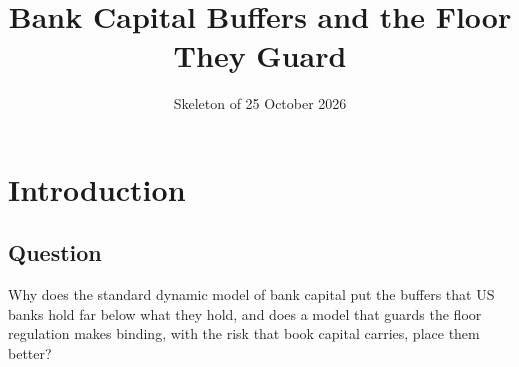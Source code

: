 \newcommand{\krow}[4]{#1 & #2 & \rowref{#3} & #4 \\ \addlinespace}
\newcommand{\prow}[6]{#1 & #2 & #3 & #4 & #5 & \rowref{#6} \\ \addlinespace}
\newcommand{\arow}[6]{#1 & #2 & #3 & #4 & \rowref{#5} & #6 \\ \addlinespace}
\newcommand{\mrow}[4]{#1 & #2 & #3 & \lean{#4} & p.~\pageref{proof:#1} \\ \addlinespace}
\newcommand{\erow}[6]{#1 & #2 & #3 & \rowref{#4} & \rowref{#5} & \path{#6} \\ \addlinespace}
\newcommand{\lrow}[6]{#1 & \citet{#2} & #3 & ``#4'' & #5 & \rowref{#6} \\ \addlinespace}
\newcommand{\crow}[3]{#1 & #2 & \rowref{#3} \\ \addlinespace}
\newcommand{\mm}[6]{#1 & \textbf{#2} & #3 & #4 & #5 & #6 \\ \addlinespace}

\newenvironment{mproof}[2]
  {\subsection*{Proof of #1}\label{proof:#1}%
   {\raggedright\noindent\textit{Lean:} \lean{#2}.\par}\smallskip}
  {\par\hfill$\square$\par\medskip}

\newcommand{\fl}{\underline{k}}

\title{Bank Capital Buffers and the Floor They Guard}
\date{Skeleton of 25 October 2026}


\maketitle

\section{Introduction}\label{sec:intro}

\subsection{Question}

Why does the standard dynamic model of bank capital put the buffers that US
banks hold far below what they hold, and does a model that guards the floor
regulation makes binding, with the risk that book capital carries, place them
better?

